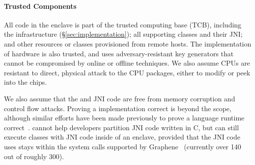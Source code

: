 
\paragraph{Trusted Components}
All code in the enclave is part of the trusted computing base (TCB),
including the \sysname{} infrastructure 
(\S\ref{sec:implementation}); %
all supporting classes and their JNI;
and other resources or classes provisioned from remote hosts.
The implementation of \sgx{} hardware is also trusted,
and uses adversary-resistant key generators that cannot be compromised
by online or offline techniques.
We also assume \intel{} CPUs are resistant to direct, physical attack to the CPU packages, either to modify or peek into the chips.

We also assume that the \jvm{} and JNI code are free from memory corruption and control flow attacks.
Proving a \jvm{} implementation correct is beyond the scope, although similar 
efforts have been made previously to prove a language runtime correct~\cite{yang10safe}.
\sysname{} cannot help developers partition JNI code written in C,
but can still execute classes with JNI code inside of an enclave, provided that
the JNI code uses stays within the system calls supported by Graphene~\cite{tsai14graphene} (currently over 140 out of roughly 300).


\begin{comment}
We do not support running \java{} application with JIT optimization
inside the enclave.
Even if running \java{} application with JIT optimization
can improve the performance of execution,
we avoid adding the huge JIT compiler to the TCB of the enclaves.
\end{comment}

